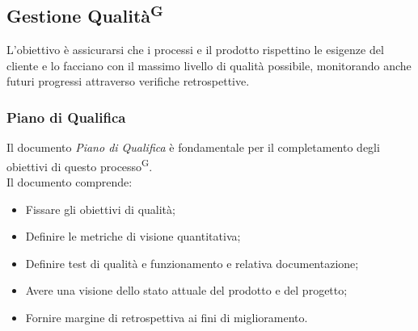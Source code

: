 \documentclass[8pt]{article}
\newcommand{\glossterm}[1]{#1\textsuperscript{G}} %
\begin{document}
\subsection{Gestione \glossterm{Qualità}}
L'obiettivo è assicurarsi che i processi e il prodotto rispettino le esigenze del cliente e lo facciano con il massimo livello di qualità possibile, monitorando anche futuri progressi attraverso verifiche retrospettive.

\subsubsection{Piano di Qualifica}
Il documento \textit{Piano di Qualifica} è fondamentale per il completamento degli obiettivi di questo \glossterm{processo}. 
\\Il documento comprende:
\begin{itemize}
    \item Fissare gli obiettivi di qualità;
    \item Definire le metriche di visione quantitativa;
    \item Definire test di qualità e funzionamento e relativa documentazione;
    \item Avere una visione dello stato attuale del prodotto e del progetto;
    \item Fornire margine di retrospettiva ai fini di miglioramento.
\end{itemize}
\end{document}
